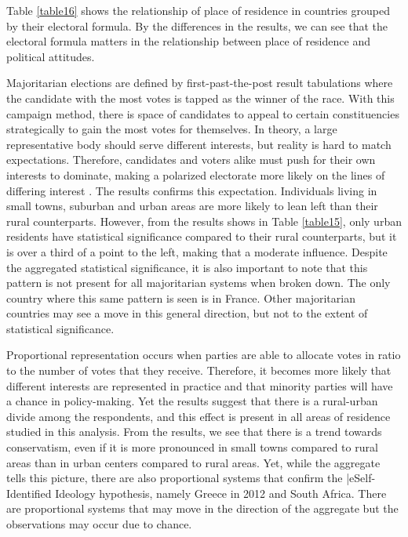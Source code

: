 \documentclass[12pt, titlepage]{article}
\begin{document}
Table \ref{table16} shows the relationship of place of residence in countries grouped by their electoral formula. By the differences in the results, we can see that the electoral formula matters in the relationship between place of residence and political attitudes.

Majoritarian elections are defined by first-past-the-post result tabulations where the candidate with the most votes is tapped as the winner of the race. With this campaign method, there is space of candidates to appeal to certain constituencies strategically to gain the most votes for themselves. In theory, a large representative body should serve different interests, but reality is hard to match expectations. Therefore, candidates and voters alike must push for their own interests to dominate, making a polarized electorate more likely on the lines of differing interest \cite{abramowitz-2010}. The results confirms this expectation. Individuals living in small towns, suburban and urban areas are more likely to lean left than their rural counterparts. However, from the results shows in Table \ref{table15}, only urban residents have statistical significance compared to their rural counterparts, but it is over a third of a point to the left, making that a moderate influence. Despite the aggregated statistical significance, it is also important to note that this pattern is not present for all majoritarian systems when broken down. The only country where this same pattern is seen is in France. Other majoritarian countries may see a move in this general direction, but not to the extent of statistical significance.

Proportional representation occurs when parties are able to allocate votes in ratio to the number of votes that they receive. Therefore, it becomes more likely that different interests are represented in practice and that minority parties will have a chance in policy-making. Yet the results suggest that there is a rural-urban divide among the respondents, and this effect is present in all areas of residence studied in this analysis. From the results, we see that there is a trend towards conservatism, even if it is more pronounced in small towns compared to rural areas than in urban centers compared to rural areas. Yet, while the aggregate tells this picture, there are also proportional systems that confirm the |e{Self-Identified Ideology} hypothesis, namely Greece in 2012 and South Africa. There are proportional systems that may move in the direction of the aggregate but the observations may occur due to chance.
\end{document}

